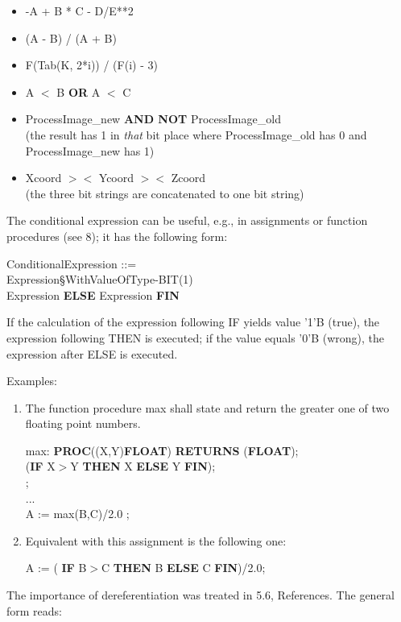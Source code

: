 \begin{itemize}
\item -A + B * C - D/E**2
\item (A - B) / (A + B)
\item F(Tab(K, 2*i)) / (F(i) - 3)
\item A $<$ B {\bf OR} A $<$ C
\item ProcessImage\_new {\bf AND NOT} ProcessImage\_old\\
      (the result has 1 in {\it that} bit place where ProcessImage\_old
      has 0 and ProcessImage\_new has 1)
\item Xcoord $><$ Ycoord $><$ Zcoord\\
      (the three bit strings are concatenated to one bit string)
\end{itemize}

The conditional expression can be useful, e.g., in assignments or
function procedures (see 8); it has the following form:

ConditionalExpression ::=\\
 Expression\S WithValueOfType-BIT(1)\\
\x {} Expression {\bf ELSE} Expression {\bf FIN}

If the calculation of the expression following IF yields value '1'B
(true), the expression following THEN is executed; if the value equals '0'B (wrong), the expression after ELSE
is executed.

Examples:

\begin{enumerate}
\item The function procedure max shall state and return the greater one
      of two floating point numbers.

      max: {\bf PROC}((X,Y){\bf FLOAT}) {\bf RETURNS} ({\bf FLOAT});\\
      ({\bf IF} X$>$Y {\bf THEN} X {\bf ELSE} Y {\bf FIN});\\
      ;\\
      ... \\
      A := max(B,C)/2.0 ;

\item Equivalent with this assignment is the following one:

      A := ( {\bf IF} B$>$C {\bf THEN} B {\bf ELSE} C {\bf FIN})/2.0;
\end{enumerate}

The importance of dereferentiation was treated in 5.6, References. The
general form reads:

